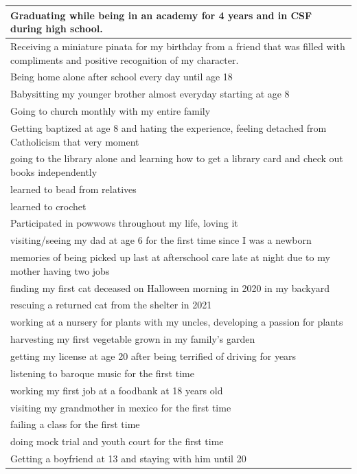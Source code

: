 \documentclass[
  .7em,
  letterpaper,
  DIV=11,
  numbers=noendperiod]{scrartcl}
\begin{document}
\begin{table}
\begin{tabular}{l}
\hline
Graduating while being in an academy for 4 years and in CSF during high school.\\
\hline
Receiving a miniature pinata for my birthday from a friend that was filled with compliments and positive recognition of my character.\\
\hline
Being home alone after school every day until age 18\\
\hline
Babysitting my younger brother almost everyday starting at age 8\\
\hline
Going to church monthly with my entire family\\
\hline
Getting baptized at age 8 and hating the experience, feeling detached from Catholicism that very moment\\
\hline
going to the library alone and learning how to get a library card and check out books independently\\
\hline
learned to bead from relatives\\
\hline
learned to crochet\\
\hline
Participated in powwows throughout my life, loving it\\
\hline
visiting/seeing my dad at age 6 for the first time since I was a newborn\\
\hline
memories of being picked up last at afterschool care late at night due to my mother having two jobs\\
\hline
finding my first cat deceased on Halloween morning in 2020 in my backyard\\
\hline
rescuing a returned cat from the shelter in 2021\\
\hline
working at a nursery for plants with my uncles, developing a passion for plants\\
\hline
harvesting my first vegetable grown in my family's garden\\
\hline
getting my license at age 20 after being terrified of driving for years\\
\hline
listening to baroque music for the first time\\
\hline
working my first job at a foodbank at 18 years old\\
\hline
visiting my grandmother in mexico for the first time\\
\hline
failing a class for the first time\\
\hline
doing mock trial and youth court for the first time\\
\hline
Getting a boyfriend at 13 and staying with him until 20\\

\end{tabular}
\end{table}
\end{document}
